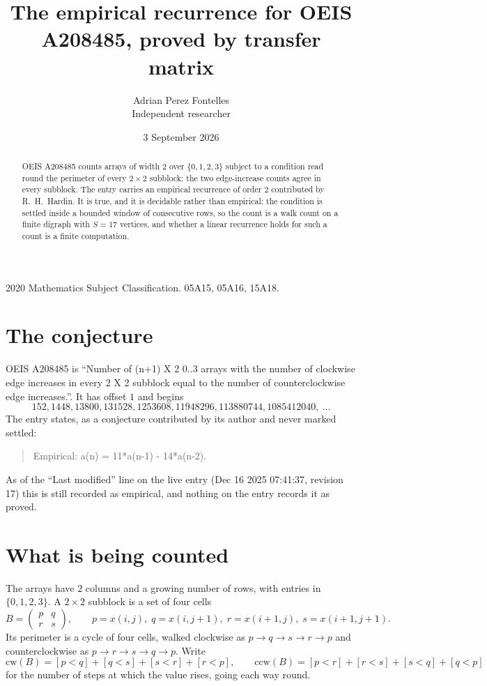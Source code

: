 \documentclass[11pt,a4paper]{article}
\title{The empirical recurrence for OEIS A208485, proved by transfer matrix}
\author{Adrian Perez Fontelles\\ \small Independent researcher}
\date{3 September 2026}
\theoremstyle{plain}
\theoremstyle{definition}
\begin{document}
\maketitle

\begin{abstract}
OEIS A208485 counts arrays of width $2$ over $\{0,1,2,3\}$ subject to a condition read round the
perimeter of every $2\times2$ subblock: the two edge-increase counts agree in every subblock. The entry carries an empirical recurrence of
order $2$ contributed by R.~H.~Hardin. It is true, and it is decidable rather than
empirical: the condition is settled inside a bounded window of consecutive rows, so the
count is a walk count on a finite digraph with $S=17$ vertices, and whether a linear
recurrence holds for such a count is a finite computation.
\end{abstract}

\noindent\small 2020 Mathematics Subject Classification. 05A15, 05A16, 15A18.\normalsize

\section{The conjecture}

OEIS A208485 is ``Number of (n+1) X 2 0..3 arrays with the number of clockwise edge increases in every 2 X 2 subblock equal to the number of counterclockwise edge increases.''. It has offset $1$ and begins
\[
152, 1448, 13800, 131528, 1253608, 11948296, 113880744, 1085412040,\ \dots
\]
The entry states, as a conjecture contributed by its author and never marked settled:
\begin{quote}
Empirical: a(n) = 11*a(n-1) - 14*a(n-2).
\end{quote}
As of the ``Last modified'' line on the live entry (Dec 16 2025 07:41:37, revision 17) this is still
recorded as empirical, and nothing on the entry records it as proved.

\section{What is being counted}

The arrays have $2$ columns and a growing number of rows, with entries in $\{0,1,2,3\}$. A
$2\times2$ subblock is a set of four cells
\[
B=\begin{pmatrix} p & q \\ r & s \end{pmatrix},
\qquad p=x(i,j),\; q=x(i,j+1),\; r=x(i+1,j),\; s=x(i+1,j+1).
\]
Its perimeter is a cycle of four cells, walked clockwise as $p\to q\to s\to r\to p$ and
counterclockwise as $p\to r\to s\to q\to p$. Write
\[
\mathrm{cw}(B)=[p<q]+[q<s]+[s<r]+[r<p],\qquad
\mathrm{ccw}(B)=[p<r]+[r<s]+[s<q]+[q<p]
\]
for the number of steps at which the value rises, going each way round.
\end{document}
